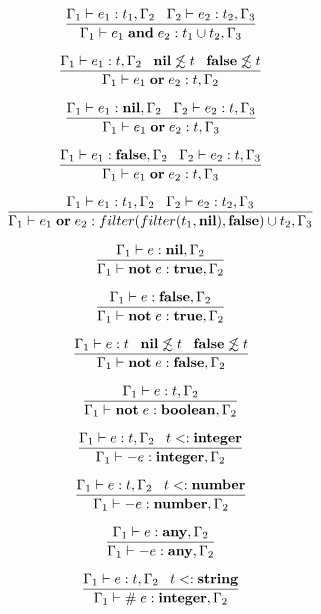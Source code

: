 \[
\dfrac{\Gamma_{1} \vdash e_{1}:t_{1}, \Gamma_{2} \;\;\;
       \Gamma_{2} \vdash e_{2}:t_{2}, \Gamma_{3}}
      {\Gamma_{1} \vdash e_{1} \; \mathbf{and} \; e_{2}:t_{1} \cup t_{2}, \Gamma_{3}}
\]

\[
\dfrac{\Gamma_{1} \vdash e_{1}:t, \Gamma_{2} \;\;\;
       \mathbf{nil} \not\lesssim t \;\;\;
       \mathbf{false} \not\lesssim t}
      {\Gamma_{1} \vdash e_{1} \; \mathbf{or} \; e_{2}:t, \Gamma_{2}}
\]

\[
\dfrac{\Gamma_{1} \vdash e_{1}:\mathbf{nil}, \Gamma_{2} \;\;\;
       \Gamma_{2} \vdash e_{2}:t, \Gamma_{3}}
      {\Gamma_{1} \vdash e_{1} \; \mathbf{or} \; e_{2}:t, \Gamma_{3}}
\]

\[
\dfrac{\Gamma_{1} \vdash e_{1}:\mathbf{false}, \Gamma_{2} \;\;\;
       \Gamma_{2} \vdash e_{2}:t, \Gamma_{3}}
      {\Gamma_{1} \vdash e_{1} \; \mathbf{or} \; e_{2}:t, \Gamma_{3}}
\]

\[
\dfrac{\Gamma_{1} \vdash e_{1}:t_{1}, \Gamma_{2} \;\;\;
       \Gamma_{2} \vdash e_{2}:t_{2}, \Gamma_{3}}
      {\Gamma_{1} \vdash e_{1} \; \mathbf{or} \; e_{2}:filter(filter(t_{1}, \mathbf{nil}), \mathbf{false}) \cup t_{2}, \Gamma_{3}}
\]

\[
\dfrac{\Gamma_{1} \vdash e:\mathbf{nil}, \Gamma_{2}}
      {\Gamma_{1} \vdash \mathbf{not} \; e:\mathbf{true}, \Gamma_{2}}
\]

\[
\dfrac{\Gamma_{1} \vdash e:\mathbf{false}, \Gamma_{2}}
      {\Gamma_{1} \vdash \mathbf{not} \; e:\mathbf{true}, \Gamma_{2}}
\]

\[
\dfrac{\Gamma_{1} \vdash e:t \;\;\;
       \mathbf{nil} \not\lesssim t \;\;\;
       \mathbf{false} \not\lesssim t}
      {\Gamma_{1} \vdash \mathbf{not} \; e:\mathbf{false}, \Gamma_{2}}
\]

\[
\dfrac{\Gamma_{1} \vdash e:t, \Gamma_{2}}
      {\Gamma_{1} \vdash \mathbf{not} \; e:\mathbf{boolean}, \Gamma_{2}}
\]

\[
\dfrac{\Gamma_{1} \vdash e:t, \Gamma_{2} \;\;\;
       t <: \mathbf{integer}}
      {\Gamma_{1} \vdash - e:\mathbf{integer}, \Gamma_{2}}
\]

\[
\dfrac{\Gamma_{1} \vdash e:t, \Gamma_{2} \;\;\;
       t <: \mathbf{number}}
      {\Gamma_{1} \vdash - e:\mathbf{number}, \Gamma_{2}}
\]

\[
\dfrac{\Gamma_{1} \vdash e:\mathbf{any}, \Gamma_{2}}
      {\Gamma_{1} \vdash - e:\mathbf{any}, \Gamma_{2}}
\]

\[
\dfrac{\Gamma_{1} \vdash e:t, \Gamma_{2} \;\;\;
       t <: \mathbf{string}}
      {\Gamma_{1} \vdash \# \; e:\mathbf{integer}, \Gamma_{2}}
\]

